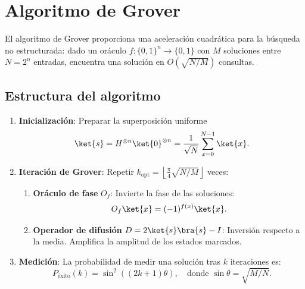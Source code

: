 \section{Algoritmo de Grover}
\label{sec:grover}

El algoritmo de Grover \parencite{grover1996fast} proporciona una aceleración cuadrática para la búsqueda no estructurada: dado un oráculo $f: \{0,1\}^n \to \{0,1\}$ con $M$ soluciones entre $N = 2^n$ entradas, encuentra una solución en $O(\sqrt{N/M})$ consultas.

\subsection{Estructura del algoritmo}

\begin{enumerate}
  \item \textbf{Inicialización}: Preparar la superposición uniforme
  \begin{equation}
    \ket{s} = H^{\otimes n}\ket{0}^{\otimes n} = \frac{1}{\sqrt{N}} \sum_{x=0}^{N-1} \ket{x}.
    \label{eq:grover_init}
  \end{equation}
  
  \item \textbf{Iteración de Grover}: Repetir $k_{\text{opt}} = \left\lfloor \frac{\pi}{4}\sqrt{N/M} \right\rfloor$ veces:
  \begin{enumerate}[label=\alph*.]
    \item \textbf{Oráculo de fase} $O_f$: Invierte la fase de las soluciones:
    \begin{equation}
      O_f\ket{x} = (-1)^{f(x)}\ket{x}.
      \label{eq:oracle}
    \end{equation}
    
    \item \textbf{Operador de difusión} $D = 2\ket{s}\bra{s} - I$: Inversión respecto a la media. Amplifica la amplitud de los estados marcados.
  \end{enumerate}
  
  \item \textbf{Medición}: La probabilidad de medir una solución tras $k$ iteraciones es:
  \begin{equation}
    P_{\text{éxito}}(k) = \sin^2\left((2k+1)\theta\right), \quad \text{donde } \sin\theta = \sqrt{M/N}.
    \label{eq:grover_prob}
  \end{equation}
\end{enumerate}

